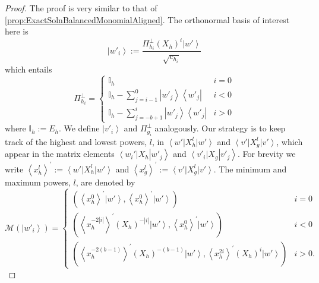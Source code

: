 \documentclass{theoretics}
\begin{document}
\begin{proof}
  The proof is very similar to that of \cref{prop:ExactSolnBalancedMonomialAligned}.
  The orthonormal basis of interest here is
  \begin{displaymath}
    \left|w'_{i}\right\rangle :=\frac{\Pi_{h_{i}}^{\perp}(X_{h})^{i}\left|w'\right\rangle }{\sqrt{c_{h_{i}}}}
  \end{displaymath}
  which entails
  \begin{displaymath}
    \Pi_{h_{i}}^{\perp}=\begin{cases}
      \mathbb{I}_{h}                                                                       & i=0 \\
      \mathbb{I}_{h}-\sum_{j=i-1}^{0}\left|w'_{j}\right\rangle \left\langle w'_{j}\right|  & i<0 \\
      \mathbb{I}_{h}-\sum_{j=-b+1}^{i}\left|w'_{j}\right\rangle \left\langle w'_{j}\right| & i>0
    \end{cases}
  \end{displaymath}
  where $\mathbb{I}_{h}:=E_{h}$. We define $\left|v'_{i}\right\rangle $
  and $\Pi_{g_{i}}^{\perp}$ analogously. Our strategy is to keep track
  of the highest and lowest powers, $l$, in $\left\langle w'\right|X_{h}^{l}\left|w'\right\rangle $
  and $\left\langle v'\right|X_{g}^{l}\left|v'\right\rangle $, which
  appear in the matrix elements $\left\langle w_{i}'\right|X_{h}\left|w'_{j}\right\rangle $
  and $\left\langle v'_{i}\right|X_{g}\left|v'_{j}\right\rangle $.
  For brevity  we write $\left\langle x_{h}^{l}\right\rangle ^{\prime}:=\left\langle w'\right|X_{h}^{l}\left|w'\right\rangle $
  and $\left\langle x_{g}^{l}\right\rangle ^{\prime}:=\left\langle v'\right|X_{g}^{l}\left|v'\right\rangle $.
  The minimum and maximum powers, $l$, are denoted by
  \begin{displaymath}
    \mathcal{M}(\left|w'_{i}\right\rangle )=\begin{cases}
      \left(\left\langle x_{h}^{0}\right\rangle ^{\prime}\left|w'\right\rangle ,\left\langle x_{h}^{0}\right\rangle ^{\prime}\left|w'\right\rangle \right)                                         & i=0  \\
      \left(\left\langle x_{h}^{-2\left|i\right|}\right\rangle ^{\prime}(X_{h})^{-\left|i\right|}\left|w'\right\rangle ,\left\langle x_{h}^{0}\right\rangle ^{\prime}\left|w'\right\rangle \right) & i<0  \\
      \left(\left\langle x_{h}^{-2(b-1)}\right\rangle ^{\prime}(X_{h})^{-(b-1)}\left|w'\right\rangle ,\left\langle x_{h}^{2i}\right\rangle ^{\prime}(X_{h})^{i}\left|w'\right\rangle \right)       & i>0.

\end{cases}
\end{displaymath}
\end{proof}
\end{document}

